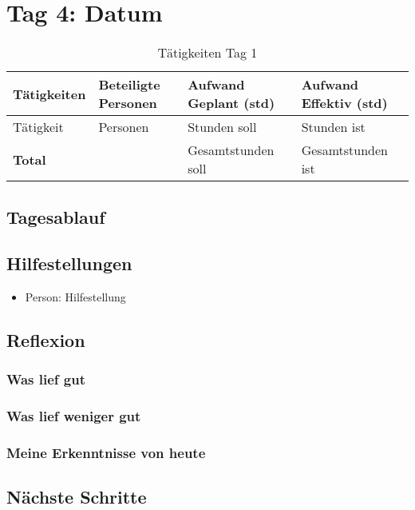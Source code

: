 \section{Tag 4: Datum}
\begin{table}[H]
    \begin{tabular}{|L{0.4\textwidth}|C{60pt}|C{60pt}|C{60pt}|}
        \hline
        \color{white}Tätigkeiten & \color{white}Beteiligte \color{white}Personen & \color{white}Aufwand Geplant (std) & \color{white}Aufwand Effektiv (std) \\
        \hline
         Tätigkeit & Personen & Stunden soll & Stunden ist \\
        \hline
        \textbf{Total} &  & Gesamtstunden soll & Gesamtstunden ist \\
        \hline
    \end{tabular}
    \caption{Tätigkeiten Tag 1}
\end{table}

\subsection*{Tagesablauf}

\subsection*{Hilfestellungen}
\begin{itemize}
    \item Person: Hilfestellung
\end{itemize}

\subsection*{Reflexion}

\subsubsection*{Was lief gut}

\subsubsection*{Was lief weniger gut}

\subsubsection*{Meine Erkenntnisse von heute}

\subsection*{Nächste Schritte}

\pagebreak
